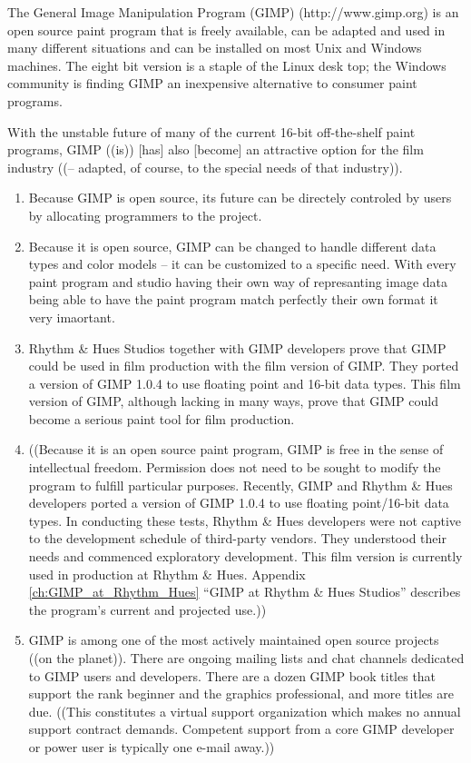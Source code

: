 The General Image Manipulation Program (GIMP) (http://www.gimp.org)
is an open source paint program that is freely available, can be
adapted and used in many different situations and can be installed on
most Unix and Windows machines. The eight bit version is a staple of
the Linux desk top; the Windows community is finding GIMP an
inexpensive alternative to consumer paint programs.

With the unstable future of many of the current 16-bit off-the-shelf paint
programs, GIMP ((is)) [has] also [become] an attractive option for the film industry ((-- adapted,
of course, to the special needs of that industry)). 

\begin{enumerate}

\item Because GIMP is open source, its future can be directely controled by users by allocating programmers to the project.

\item Because it is open source, GIMP can be changed to handle different data types and color models -- it can be customized to a specific need. With every paint program and studio having their own way of represanting image data being able to have the paint program match perfectly their own format it very imaortant.   

\item Rhythm \& Hues Studios together with GIMP developers prove that GIMP could be used in film production with the film version of GIMP. They ported a version of GIMP 1.0.4 to use floating point and 16-bit data types. This film version of GIMP, although lacking in many ways, prove that GIMP could become a serious paint tool for film production.  

\item ((Because it is an open source paint program, GIMP is free in the sense of
intellectual freedom. Permission does not need to be sought to modify
the program to fulfill particular purposes. Recently, GIMP and Rhythm
\& Hues developers ported a version of GIMP 1.0.4 to use floating
point/16-bit data types. In conducting these tests, Rhythm \& Hues developers
were not captive to the development schedule of third-party
vendors. They understood their needs and commenced exploratory
development. This film version is currently used
in production at Rhythm \& Hues. Appendix \ref{ch:GIMP_at_Rhythm_Hues} 
``GIMP at Rhythm \& Hues Studios'' describes the program's
current and projected use.))

\item GIMP is among one of the most actively maintained open source projects
((on the planet)). There are ongoing mailing lists and chat channels
dedicated to GIMP users and developers. There are a dozen GIMP book
titles that support the rank beginner and the graphics professional,
and more titles are due. ((This constitutes a virtual support
organization which makes no annual support contract demands. Competent
support from a core GIMP developer or power user is typically one
e-mail away.))

\end{enumerate}

